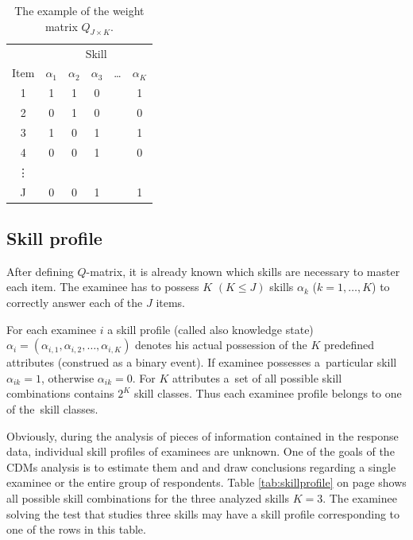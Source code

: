 \documentclass[english]{pwr_wmat_praca_dyplomowa}
\theoremstyle{plain}
\numberwithin{theorem}{chapter}
\theoremstyle{definition}
\numberwithin{theorem}{chapter}
\begin{document}
	\begin{table}[H]
		\centering
		\begin{tabular}{c c c c c c} 
			\hline
			{\rule{0pt}{3ex}} & \multicolumn{5}{c}{Skill} \\
			Item & $\alpha_1$ & $\alpha_2$ & $\alpha_3$ & \ldots & $\alpha_K$ \\ [0.5ex] 
			\hline
			1 & 1 & 1 & 0 & & 1 \\ 
			2 & 0 & 1 & 0 & & 0 \\
			3 & 1 & 0 & 1 & & 1 \\
			4 & 0 & 0 & 1 & & 0 \\
			\vdots & & & & & \\
			J & 0 & 0 & 1 & & 1\\ [1ex] 
			\hline
		\end{tabular}
		\caption{The example of the weight matrix $Q_{J \times K}$.}
		\label{tab:qmatrix} 
	\end{table}
	
	\subsection{Skill profile}\label{subsec:skill_prof}
	
	After defining $Q$-matrix, it is already known which skills are necessary to master each item. The examinee has to possess  $K$ $(K\leq J)$ skills $\alpha_k$ ($k=1,\ldots,K$) to correctly answer each of the $J$ items. 
	
	For each examinee $i$ a skill profile (called also knowledge state) $\alpha_i = (\alpha_{i,1}, \alpha_{i,2}, \ldots, \alpha_{i,K})$ denotes his actual possession of the $K$ predefined attributes (construed as a binary event). If examinee possesses a~particular skill $\alpha_{ik}=1$, otherwise $\alpha_{ik}=0$. For $K$ attributes a~set of all possible skill combinations contains $2^K$ skill classes. Thus each examinee profile belongs to one of the~skill classes. 
	
	Obviously, during the analysis of pieces of information contained in the response data, individual skill profiles of examinees are unknown. One of the goals of the CDMs analysis is to estimate them and and draw conclusions regarding a single examinee or the entire group of respondents. Table \ref{tab:skillprofile} on page \pageref{tab:skillprofile} shows all possible skill combinations for the three analyzed skills $K=3$. The examinee solving the test that studies three skills may have a skill profile corresponding to one of the rows in this table.
	
\end{document}
